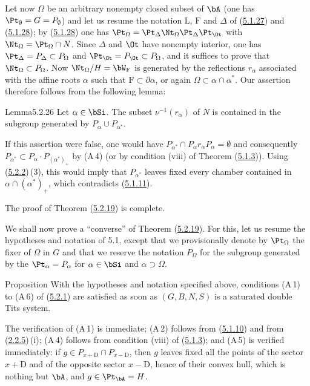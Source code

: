 \documentclass[12pt,a4paper,oneside,english]{smfart}
\makeatletter
\newcommand{\btanchor}[1]{\leavevmode\Hy@raisedlink{\hypertarget{bt:#1}{}}}
\newcommand{\btpageanchor}[1]{\Hy@raisedlink{\hypertarget{p:#1}{}}}
\newcommand{\btref}[1]{\hyperlink{bt:#1}{#1}}
\newcommand{\btpage}[1]{\marginnote{p.~#1}\btpageanchor{#1}}
\newcommand{\pg}[1]{\btpage{#1}}
\theoremstyle{definition}
\theoremstyle{bt}
\makeatother
\begin{document}
Let now $\Omega$ be an arbitrary nonempty closed subset of $\bA$ (one has
$\Pt_{\emptyset}=G=P_{\emptyset}$) and let us resume the notation $\mathrm{L}$,
$\mathrm{F}$ and $\Delta$ of (\btref{5.1.27}) and (\btref{5.1.28}); by (\btref{5.1.28}) one has
$\Pt_{\Omega}=\Pt_{\Delta}\Nt_{\Omega}\Pt_{\Delta}\Pt_{\Ot}$ with
$\Nt_{\Omega}=\Pt_{\Omega}\cap N$. Since $\Delta$ and $\Ot$ have nonempty
interior, one has $\Pt_{\Delta}=P_{\Delta}\subset P_{\Omega}$ and
$\Pt_{\Ot}=P_{\Ot}\subset P_{\Omega}$, and it suffices to prove that
$\Nt_{\Omega}\subset P_{\Omega}$. Now $\Nt_{\Omega}/H=\bW_{\mathrm{F}}$ is
generated by the reflections $r_{\alpha}$ associated with the affine roots
$\alpha$ such that $\mathrm{F}\subset\partial\alpha$, or again
$\Omega\subset\alpha\cap\alpha^{*}$. Our assertion therefore follows from the
following lemma:

\begin{btstat}{Lemma}{5.2.26}\btanchor{5.2.26}
Let $\alpha\in\bSi$. The subset $\nu^{-1}(r_{\alpha})$ of $N$ is contained in
the subgroup generated by $P_{\alpha}\cup P_{\alpha^{*}}$.
\end{btstat}

If this assertion were false, one would have
$P_{\alpha^{*}}\cap P_{\alpha}r_{\alpha}P_{\alpha}=\emptyset$ and consequently
$P_{\alpha^{*}}\subset P_{\alpha}\cdot P_{(\alpha^{*})_{+}}$ by (A\,4) (or by
condition (viii) of Theorem (\btref{5.1.3})). Using (\btref{5.2.2})\,(3), this would imply that
$P_{\alpha^{*}}$ leaves fixed every chamber contained in
$\alpha\cap(\alpha^{*})_{+}$, which contradicts (\btref{5.1.11}).

The proof of Theorem (\btref{5.2.19}) is complete.

\pg{104}
\btanchor{5.2.27}
We shall now prove a ``converse'' of Theorem (\btref{5.2.19}). For this, let us resume
the hypotheses and notation of 5.1, except that we provisionally denote by
$\Pt_{\Omega}$ the fixer of $\Omega$ in $G$ and that we reserve the notation
$P_{\Omega}$ for the subgroup generated by the $\Pt_{\alpha}=P_{\alpha}$ for
$\alpha\in\bSi$ and $\alpha\supset\Omega$.

\begin{btstatu}{Proposition}
With the hypotheses and notation specified above, conditions
\textup{(A\,1)} to \textup{(A\,6)} of \textup{(\btref{5.2.1})} are satisfied as soon as
$(G,B,N,S)$ is a saturated double Tits system.
\end{btstatu}

The verification of (A\,1) is immediate; (A\,2) follows from (\btref{5.1.10}) and from
(\btref{2.2.5})\,(i); (A\,4) follows from condition (viii) of (\btref{5.1.3}); and (A\,5) is
verified immediately: if $g\in P_{x+\mathrm{D}}\cap P_{x-\mathrm{D}}$, then $g$
leaves fixed all the points of the sector $x+\mathrm{D}$ and of the opposite
sector $x-\mathrm{D}$, hence of their convex hull, which is nothing but $\bA$,
and $g\in\Pt_{\bA}=H$.
\end{document}
